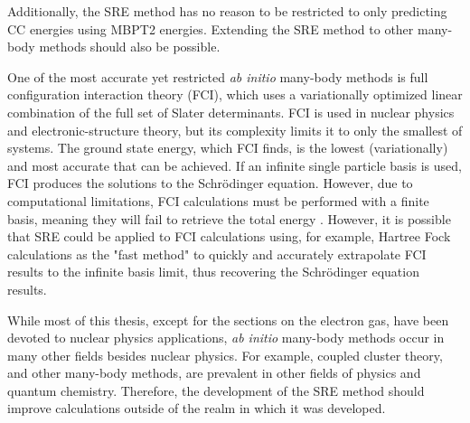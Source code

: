 Additionally, the SRE method has no reason to be restricted to only predicting CC energies using MBPT2 energies. Extending the SRE method to other many-body methods should also be possible. 

One of the most accurate yet restricted \textit{ab initio} many-body methods is full configuration interaction theory (FCI), which uses a variationally optimized linear combination of the full set of Slater determinants. FCI is used in nuclear physics and electronic-structure theory, but its complexity limits it to only the smallest of systems. The ground state energy, which FCI finds, is the lowest (variationally) and most accurate that can be achieved. If an infinite single particle basis is used, FCI produces the solutions to the Schr\"{o}dinger equation. However, due to computational limitations, FCI calculations must be performed with a finite basis, meaning they will fail to retrieve the total energy \cite{Ref1}. However, it is possible that SRE could be applied to FCI calculations using, for example, Hartree Fock calculations as the "fast method" to quickly and accurately extrapolate FCI results to the infinite basis limit, thus recovering the Schr\"{o}dinger equation results.

While most of this thesis, except for the sections on the electron gas, have been devoted to nuclear physics applications, \textit{ab initio} many-body methods occur in many other fields besides nuclear physics. For example, coupled cluster theory, and other many-body methods, are prevalent in other fields of physics and quantum chemistry. Therefore, the development of the SRE method should improve calculations outside of the realm in which it was developed.